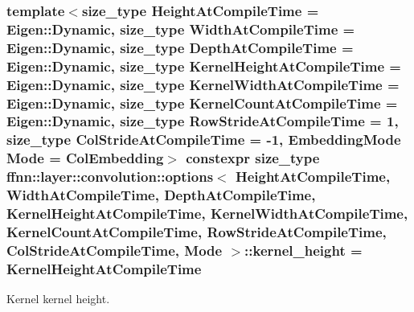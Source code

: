 \hypertarget{structffnn_1_1layer_1_1convolution_1_1options_a36fbdfa26d8032268955f68e66f09662}{
\subsubsection[{kernel\-\_\-height}]{\setlength{\rightskip}{0pt plus 5cm}template$<$size\-\_\-type Height\-At\-Compile\-Time = Eigen\-::\-Dynamic, size\-\_\-type Width\-At\-Compile\-Time = Eigen\-::\-Dynamic, size\-\_\-type Depth\-At\-Compile\-Time = Eigen\-::\-Dynamic, size\-\_\-type Kernel\-Height\-At\-Compile\-Time = Eigen\-::\-Dynamic, size\-\_\-type Kernel\-Width\-At\-Compile\-Time = Eigen\-::\-Dynamic, size\-\_\-type Kernel\-Count\-At\-Compile\-Time = Eigen\-::\-Dynamic, size\-\_\-type Row\-Stride\-At\-Compile\-Time = 1, size\-\_\-type Col\-Stride\-At\-Compile\-Time = -\/1, Embedding\-Mode Mode = Col\-Embedding$>$ constexpr {\bf size\-\_\-type} {\bf ffnn\-::layer\-::convolution\-::options}$<$ Height\-At\-Compile\-Time, Width\-At\-Compile\-Time, Depth\-At\-Compile\-Time, Kernel\-Height\-At\-Compile\-Time, Kernel\-Width\-At\-Compile\-Time, Kernel\-Count\-At\-Compile\-Time, Row\-Stride\-At\-Compile\-Time, Col\-Stride\-At\-Compile\-Time, Mode $>$\-::kernel\-\_\-height = Kernel\-Height\-At\-Compile\-Time\hspace{0.3cm}{\ttfamily [static]}}}\label{structffnn_1_1layer_1_1convolution_1_1options_a36fbdfa26d8032268955f68e66f09662}


Kernel kernel height. 

